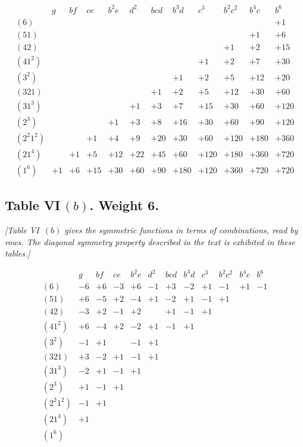 \documentclass[11pt,a4paper]{article}
\begin{document}
\[
\begin{array}{c|ccccccccccc}
& g & bf & ce & b^2 e & d^2 & bcd & b^3 d & c^3 & b^2 c^2 & b^4 c & b^6 \\ \hline
(6) & & & & & & & & & & & +1 \\
(51) & & & & & & & & & & +1 & +6 \\
(42) & & & & & & & & & +1 & +2 & +15 \\
(41^2) & & & & & & & & +1 & +2 & +7 & +30 \\
(3^2) & & & & & & & +1 & +2 & +5 & +12 & +20 \\
(321) & & & & & & +1 & +2 & +5 & +12 & +30 & +60 \\
(31^3) & & & & & +1 & +3 & +7 & +15 & +30 & +60 & +120 \\
(2^3) & & & & +1 & +3 & +8 & +16 & +30 & +60 & +90 & +120 \\
(2^2 1^2) & & & +1 & +4 & +9 & +20 & +30 & +60 & +120 & +180 & +360 \\
(21^4) & & +1 & +5 & +12 & +22 & +45 & +60 & +120 & +180 & +360 & +720 \\
(1^6) & +1 & +6 & +15 & +30 & +60 & +90 & +180 & +120 & +360 & +720 & +720
\end{array}
\]

\subsection*{Table VI\,$(b)$. Weight 6.}

\textit{[Table VI~$(b)$ gives the symmetric functions in terms of combinations,
read by rows. The diagonal symmetry property described in the text is
exhibited in these tables.]}

\[
\begin{array}{c|ccccccccccc}
& g & bf & ce & b^2 e & d^2 & bcd & b^3 d & c^3 & b^2 c^2 & b^4 c & b^6 \\ \hline
(6) & -6 & +6 & -3 & +6 & -1 & +3 & -2 & +1 & -1 & +1 & -1 \\
(51) & +6 & -5 & +2 & -4 & +1 & -2 & +1 & -1 & +1 \\
(42) & -3 & +2 & -1 & +2 & & +1 & -1 & +1 \\
(41^2) & +6 & -4 & +2 & -2 & +1 & -1 & +1 \\
(3^2) & -1 & +1 & & -1 & +1 \\
(321) & +3 & -2 & +1 & -1 & +1 \\
(31^3) & -2 & +1 & -1 & +1 \\
(2^3) & +1 & -1 & +1 \\
(2^2 1^2) & -1 & +1 \\
(21^4) & +1 \\
(1^6)
\end{array}
\]
\end{document}
